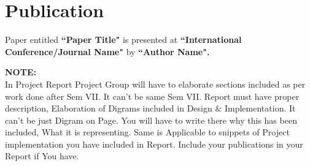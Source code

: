 \chapter*{Publication}
Paper entitled \textbf{``Paper Title"} is presented at \textbf{``International Conference/Journal Name"} by \textbf{``Author Name".}\\












\newpage

\textbf{NOTE:} \\

In Project Report Project Group will  have to elaborate sections included as per work done after Sem VII.  It can't be same  Sem VII. Report must have proper description, Elaboration  of Digrams included in Design \& Implementation. It can't be just Digram on Page. You will have to write there why this has been included, What it is representing. Same is Applicable to snippets of Project implementation you have included in Report. Include your publications in your Report if You have. \\